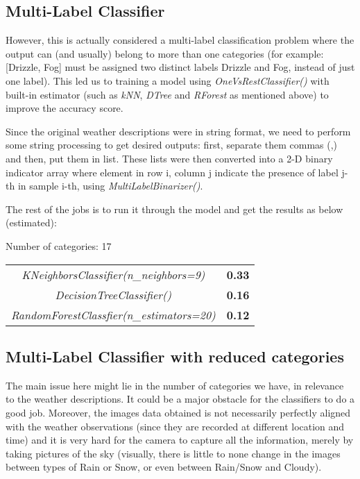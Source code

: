 \subsection{Multi-Label Classifier}

However, this is actually considered a multi-label classification problem where the output can (and usually) belong to more than one categories (for example: [Drizzle, Fog] must be assigned two distinct labels Drizzle and Fog, instead of just one label). This led us to training a model using \textit{OneVsRestClassifier()} with built-in estimator (such as \textit{kNN}, \textit{DTree} and \textit{RForest} as mentioned above) to improve the accuracy score. 

Since the original weather descriptions were in string format, we need to perform some string processing to get desired outputs: first, separate them commas (,) and then, put them in list. These lists were then converted into a 2-D binary indicator array where element in row i, column j indicate the presence of label j-th in sample i-th, using \textit{MultiLabelBinarizer()}.

The rest of the jobs is to run it through the model and get the results as below (estimated):

\begin{table} [h]
	\centering

Number of categories: 17 \\

\begin{tabular}{c|c} 
    \textit{KNeighborsClassifier(n\_neighbors=9)} & \textbf{0.33} \\
    \textit{DecisionTreeClassifier()} & \textbf{0.16} \\
    \textit{RandomForestClassfier(n\_estimators=20)} & \textbf{0.12}
\end{tabular}

\end{table}

\subsection{Multi-Label Classifier with reduced categories}
The main issue here might lie in the number of categories we have, in relevance to the weather descriptions. It could be a major obstacle for the classifiers to do a good job. Moreover, the images data obtained is not necessarily perfectly aligned with the weather observations (since they are recorded at different location and time) and it is very hard for the camera to capture all the information, merely by taking pictures of the sky (visually, there is little to none change in the images between types of Rain or Snow, or even between Rain/Snow and Cloudy).


